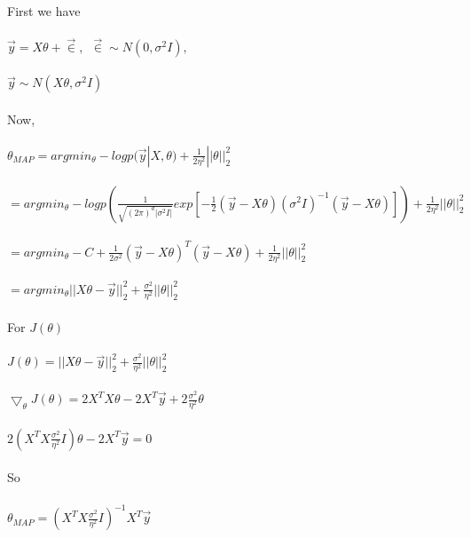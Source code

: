 \newcommand\tab[1][1cm]{\hspace*{#1}}
\begin{answer}
\\ \\
First we have \\ \\
\tab $\overrightarrow{y} = X\theta + \overrightarrow{\in}, \ \  \overrightarrow{\in}\sim N(0, \sigma^2 I), \ \ $\\ \\
\tab $\overrightarrow{y} \sim N(X\theta, \sigma^2 I) $\\ \\
Now, \\ \\ 
\tab$ \theta_{MAP} = argmin_\theta - logp(\overrightarrow{y} |X,\theta) + \frac{1}{2\eta^2}||\theta||_2^2$ \\ \\
\tab[2cm]$= argmin_\theta - logp( \frac{1}{\sqrt{(2\pi)^d|\sigma^2I|}} exp [-\frac{1}{2}(\overrightarrow{y} - X\theta)(\sigma^2I)^{-1} (\overrightarrow{y} - X\theta)] ) + \frac{1}{2\eta^2}||\theta||_2^2$ \\ \\
\tab[2cm]$= argmin_\theta - C + \frac{1}{2\sigma^2} (\overrightarrow{y} - X\theta)^T(\overrightarrow{y} - X\theta) + \frac{1}{2\eta^2}||\theta||_2^2$ \\ \\
\tab[2cm]$= argmin_\theta || X\theta - \overrightarrow{y} ||_2^2 + \frac{\sigma^2}{\eta^2}||\theta||_2^2$ \\ \\
For $J(\theta)$ \\ \\
\tab$J(\theta) = || X\theta-\overrightarrow{y} ||_2^2 + \frac{\sigma^2}{\eta^2}||\theta||_2^2$ \\ \\
\tab$\bigtriangledown_\theta J(\theta) = 2X^TX\theta - 2X^T \overrightarrow{y} + 2 \frac{\sigma^2}{\eta^2}\theta $\\ \\
\tab[2cm]$2(X^TX \frac{\sigma^2}{\eta^2}I)\theta - 2X^T \overrightarrow{y} = 0$ \\ \\
So  \\ \\
\tab$\theta_{MAP} =( X^TX \frac{\sigma^2}{\eta^2}I)^{-1}X^T \overrightarrow{y}$ \\ \\
\end{answer}

